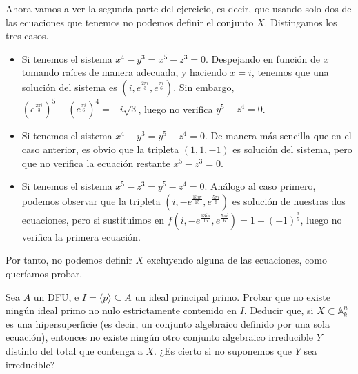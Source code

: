 \documentclass[twoside]{article}
\begin{document}
\begin{ejercicio}{6}
\begin{solucion}
\begin{enumerate}
Ahora vamos a ver la segunda parte del ejercicio, es decir, que usando solo dos de las ecuaciones que tenemos no podemos definir el conjunto $X$. Distingamos los tres casos.
\begin{itemize}
\item Si tenemos el sistema $x^4-y^3=x^5-z^3= 0$. Despejando en función de $x$ tomando raíces de manera adecuada, y haciendo $x=i$, tenemos que una solución del sistema es $(i,e^{\frac{2\pi i}{3}},e^{\frac{\pi i}{6}})$. Sin embargo, $\left(e^{\frac{2\pi i}{3}}\right)^5-\left(e^{\frac{\pi i}{6}}\right)^4 = -i\sqrt{3}$, luego no verifica $y^5-z^4 =0$.
\item Si tenemos el sistema $x^4-y^3 = y^5 - z^4=0$. De manera más sencilla que en el caso anterior, es obvio que la tripleta $(1,1,-1)$ es solución del sistema, pero que no verifica la ecuación restante $x^5-z^3=0$.
\item Si tenemos el sistema $x^5-z^3 = y^5 - z^4=0$. Análogo al caso primero, podemos observar que la tripleta $(i,-e^{\frac{13i\pi}{15}},e^{\frac{5\pi i}{6}})$ es solución de nuestras dos ecuaciones, pero si sustituimos en $f(i,-e^{\frac{13i\pi}{15}},e^{\frac{5\pi i}{6}}) = 1+(-1)^{\frac{3}{5}}$, luego no verifica la primera ecuación.
\end{itemize}
Por tanto, no podemos definir $X$ excluyendo alguna de las ecuaciones, como queríamos probar.
\end{enumerate}
\end{solucion}
\end{ejercicio}

\newpage

\begin{ejercicio}{8}
Sea $A$ un DFU, e $I = \langle p \rangle \subseteq A$ un ideal principal primo. Probar que no existe ningún ideal primo no nulo estrictamente contenido en $I$. Deducir que, si $X \subset \mathbb{A}_k^n$ es una hipersuperficie (es decir, un conjunto algebraico definido por una sola ecuación), entonces no existe ningún otro conjunto algebraico irreducible $Y$ distinto del total que contenga a $X$. ¿Es cierto si no suponemos que $Y$ sea irreducible?
\end{ejercicio}
\end{document}

